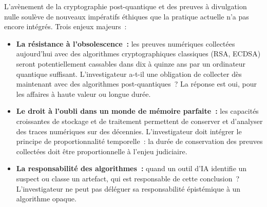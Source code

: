 L'avènement de la cryptographie post-quantique et des preuves à divulgation
nulle soulève de nouveaux impératifs éthiques que la pratique actuelle
n'a pas encore intégrés. Trois enjeux majeurs~:

\begin{itemize}
    \item \textbf{La résistance à l'obsolescence~:} les preuves numériques
          collectées aujourd'hui avec des algorithmes cryptographiques
          classiques (RSA, ECDSA) seront potentiellement cassables dans dix
          à quinze ans par un ordinateur quantique suffisant. L'investigateur
          a-t-il une obligation de collecter dès maintenant avec des
          algorithmes post-quantiques~? La réponse est oui, pour les
          affaires à haute valeur ou longue durée.

    \item \textbf{Le droit à l'oubli dans un monde de mémoire parfaite~:}
          les capacités croissantes de stockage et de traitement permettent
          de conserver et d'analyser des traces numériques sur des décennies.
          L'investigateur doit intégrer le principe de proportionnalité
          temporelle~: la durée de conservation des preuves collectées doit
          être proportionnelle à l'enjeu judiciaire.

    \item \textbf{La responsabilité des algorithmes~:} quand un outil d'IA
          identifie un suspect ou classe un artefact, qui est responsable
          de cette conclusion~? L'investigateur ne peut pas déléguer
          sa responsabilité épistémique à un algorithme opaque.
\end{itemize}

\separateur

